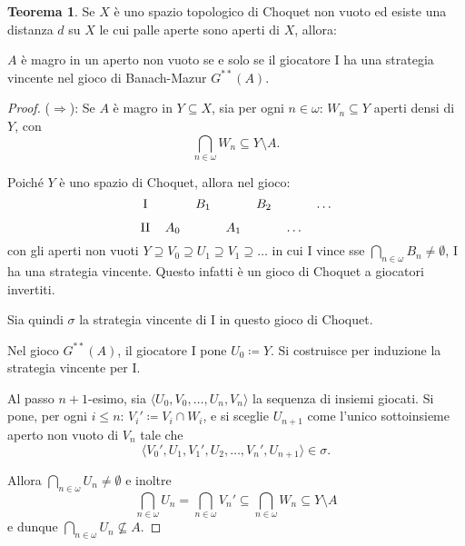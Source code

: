 \documentclass[titlepage]{article}
\newcommand{\1}{\mathds{1}}
\theoremstyle{definition}%
\newtheorem{thm}{Teorema}[section]
\theoremstyle{plain}
\theoremstyle{remark}
\begin{document}
\begin{thm}\label{sec:orged1da91}
Se \(X\) è uno {spazio topologico} {di Choquet} non {vuoto} ed esiste una {distanza} \(d\) su \(X\) le cui {palle aperte} sono aperti di \(X\), allora:

\(A\) è {magro} in un {aperto} non vuoto se e solo se il giocatore I ha una {strategia vincente} nel {gioco di Banach-Mazur} \(G^{**}(A)\).
\end{thm}
\begin{proof}
(\(\Rightarrow\)): Se \(A\) è magro in \(Y \subseteq X\), sia per ogni \(n \in \omega\): \(W_{n} \subseteq Y\) aperti densi di \(Y\), con
\begin{equation*}
\bigcap_{n \in\omega} W_{n} \subseteq Y \setminus A.
\end{equation*}

Poiché \(Y\) è uno spazio di Choquet, allora nel gioco:
\begin{equation*}
\begin{tikzcd}[ampersand replacement=\&,cramped, sep=tiny]
	{\text{I}} \&\& {B_1} \&\& {B_2} \&\& \dots \\
	{\text{II}} \& {A_0} \&\& {A_1} \&\& \dots
\end{tikzcd}
\end{equation*}
con gli aperti non vuoti \(Y\supseteq V_{0}\supseteq U_{1}\supseteq V_{1}\supseteq \dots\) in cui I vince sse \(\bigcap_{n \in \omega}{B_{n}} \neq \emptyset\), I ha una {strategia vincente}. Questo infatti è un gioco di Choquet a giocatori invertiti.

Sia quindi \(\sigma\) la strategia vincente di I in questo gioco di Choquet.

Nel gioco \(G^{**}(A)\), il giocatore I pone \(U_{0} \coloneqq Y\). Si costruisce per induzione la strategia vincente per I.

Al passo \(n+1\)-esimo, sia \(\langle U_{0},V_{0},\dots, U_{n}, V_{n}\rangle\) la sequenza di insiemi giocati. Si pone, per ogni \(i\le n\): \(V_{i}'\coloneqq V_{i}\cap W_{i}\), e si sceglie \(U_{n+1}\) come l'unico sottoinsieme aperto non vuoto di \(V_{n}\) tale che
\begin{equation*}
\langle V_{0}', U_{1}, V_{1}', U_{2},\dots, V_{n}', U_{n+1}\rangle \in\sigma.
\end{equation*}

Allora \(\bigcap_{n \in \omega} U_{n}\neq\emptyset\) e inoltre
\begin{equation*}
\bigcap_{n \in\omega} U_{n} = \bigcap_{n \in\omega} V_{n}' \subseteq \bigcap_{n \in \omega} W_{n} \subseteq Y\setminus A
\end{equation*}
e dunque \(\bigcap_{n \in\omega} U_{n} \not\subseteq A\).


\end{proof}
\end{document}
